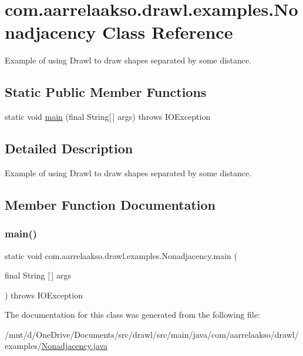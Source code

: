 \hypertarget{classcom_1_1aarrelaakso_1_1drawl_1_1examples_1_1_nonadjacency}{}\section{com.\+aarrelaakso.\+drawl.\+examples.\+Nonadjacency Class Reference}
\label{classcom_1_1aarrelaakso_1_1drawl_1_1examples_1_1_nonadjacency}


Example of using Drawl to draw shapes separated by some distance.  


\subsection*{Static Public Member Functions}
\begin{DoxyCompactItemize}
\item 
static void \hyperlink{classcom_1_1aarrelaakso_1_1drawl_1_1examples_1_1_nonadjacency_a07a43cbfddf1eff05acb1643d29f8ccf}{main} (final String\mbox{[}$\,$\mbox{]} args)  throws I\+O\+Exception     
\end{DoxyCompactItemize}


\subsection{Detailed Description}
Example of using Drawl to draw shapes separated by some distance. 

\subsection{Member Function Documentation}
\mbox{\label{classcom_1_1aarrelaakso_1_1drawl_1_1examples_1_1_nonadjacency_a07a43cbfddf1eff05acb1643d29f8ccf}} 
\subsubsection{\texorpdfstring{main()}{main()}}
{\footnotesize\ttfamily static void com.\+aarrelaakso.\+drawl.\+examples.\+Nonadjacency.\+main (\begin{DoxyParamCaption}\item[{final String \mbox{[}$\,$\mbox{]}}]{args }\end{DoxyParamCaption}) throws I\+O\+Exception\hspace{0.3cm}{\ttfamily [static]}}



The documentation for this class was generated from the following file\+:\begin{DoxyCompactItemize}
\item 
/mnt/d/\+One\+Drive/\+Documents/src/drawl/src/main/java/com/aarrelaakso/drawl/examples/\hyperlink{_nonadjacency_8java}{Nonadjacency.\+java}\end{DoxyCompactItemize}
